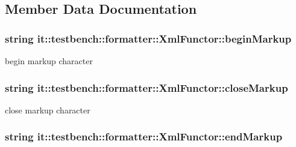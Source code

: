\subsection{Member Data Documentation}
\hypertarget{classit_1_1testbench_1_1formatter_1_1XmlFunctor_a5cdf11ecf35f0470fe04179942d67ae6}{
\subsubsection[{begin\-Markup}]{\setlength{\rightskip}{0pt plus 5cm}string it\-::testbench\-::formatter\-::\-Xml\-Functor\-::begin\-Markup\hspace{0.3cm}{\ttfamily [private]}}}\label{d4/d4d/classit_1_1testbench_1_1formatter_1_1XmlFunctor_a5cdf11ecf35f0470fe04179942d67ae6}
begin markup character \hypertarget{classit_1_1testbench_1_1formatter_1_1XmlFunctor_a3cc94e6524a110456545511fb54193fc}{
\subsubsection[{close\-Markup}]{\setlength{\rightskip}{0pt plus 5cm}string it\-::testbench\-::formatter\-::\-Xml\-Functor\-::close\-Markup\hspace{0.3cm}{\ttfamily [private]}}}\label{d4/d4d/classit_1_1testbench_1_1formatter_1_1XmlFunctor_a3cc94e6524a110456545511fb54193fc}
close markup character \hypertarget{classit_1_1testbench_1_1formatter_1_1XmlFunctor_afaf6e93b9d1b7eadbbac8c0f507acc4f}{
\subsubsection[{end\-Markup}]{\setlength{\rightskip}{0pt plus 5cm}string it\-::testbench\-::formatter\-::\-Xml\-Functor\-::end\-Markup\hspace{0.3cm}{\ttfamily [private]}}}\label{d4/d4d/classit_1_1testbench_1_1formatter_1_1XmlFunctor_afaf6e93b9d1b7eadbbac8c0f507acc4f}
